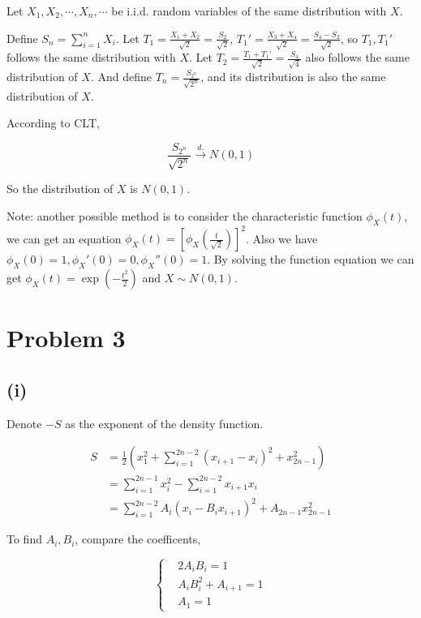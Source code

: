 \documentclass{article}
\begin{document}
Let $X_1,X_2, \cdots,X_n,\cdots$ be i.i.d. random variables of the same distribution with $X$. 

Define $S_n = \sum_{i=1}^n X_i$. Let $T_{1} = \frac{X_1+X_2}{ \sqrt{2}} = \frac{S_2}{\sqrt{2}}$, $T_1' = \frac{X_3+X_4}{\sqrt{ 2}} = \frac{S_4 -S_2}{ \sqrt{2}}$, so $T_1,T_1'$ follows the same distribution with $X$. Let $T_2 = \frac{T_1+T_1'}{\sqrt{2}} = \frac{S_4}{\sqrt{4}}$ also follows the same distribution of $X$. And define $T_n = \frac{S_{2^n}}{\sqrt{2^n}}$, and its distribution is also the same distribution of $X$. 

According to CLT, 

\begin{equation}
    \frac{S_{2^n}}{\sqrt{2^n}} \overset{d.}{\to} N(0,1)
\end{equation}

So the distribution of $X$ is $N(0,1)$.

Note: another possible method is to consider the characteristic function $\phi_{X}(t)$, we can get an equation $\phi_{X}(t) = [\phi_{X}(\frac{t}{\sqrt{2}})]^2$. Also we have $\phi_{X}(0) =1,\phi_{X}'(0) =0,\phi_{X}''(0) =1 $. By solving the function equation we can get $\phi_X(t) = \exp({-\frac{t^2}{2}})$ and $X \sim N(0,1)$. 

\section{Problem 3}
\subsection{(i)}
Denote $-S$ as the exponent of the density function.

\begin{equation}
    \begin{aligned}
        S & = \frac{1}{2}\left(x_{1}^{2}+\sum_{i=1}^{2 n-2}\left(x_{i+1}-x_{i}\right)^{2}+x_{2 n-1}^{2}\right) \\
        & = \sum_{i=1}^{2n-1} x_i^2 - \sum_{i=1}^{2 n-2} x_{i+1}x_i\\
        & = \sum_{i=1}^{2n-2} A_i( x_i-B_i x_{i+1})^2 + A_{2n-1} x_{2n-1}^2
    \end{aligned}
\end{equation}

To find $A_i,B_i$, compare the coefficents, 

\begin{equation}
    \left\{\begin{aligned}
        & 2 A_i B_i = 1\\
        & A_i B_i^2 + A_{i+1} = 1\\
        & A_1 = 1 
    \end{aligned}\right.
\end{equation}
\end{document}
